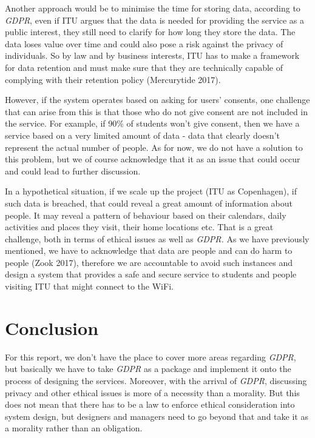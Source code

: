 \documentclass[format=acmsmall, review=false, screen=true]{acmart}
\begin{document}
Another approach would be to minimise the time for storing data, according to \textit{GDPR}, even if ITU argues that the data is needed for providing the service as a public interest, they still need to clarify for how long they store the data. The data loses value over time and could also pose a risk against the privacy of individuals. So by law and by business interests, ITU has to make a framework for data retention and must make sure that they are technically capable of complying with their retention policy (Mercurytide 2017).

However, if the system operates based on asking for users’ consents, one challenge that can arise from this is that those who do not give consent are not included in the service. For example, if 90\% of students won’t give consent, then we have a service based on a very limited amount of data - data that clearly doesn’t represent the actual number of people. As for now, we do not have a solution to this problem, but we of course acknowledge that it as an issue that could occur and could lead to further discussion.

In a hypothetical situation, if we scale up the project (ITU as Copenhagen), if such data is breached, that could reveal a great amount of information about people. It may reveal a pattern of behaviour based on their calendars, daily activities and places they visit, their home locations etc. That is a great challenge, both in terms of ethical issues as well as \textit{GDPR.}
As we have previously mentioned, we have to acknowledge that data are people and can do harm to people (Zook 2017), therefore we are accountable to avoid such instances and design a system that provides a safe and secure service to students and people visiting ITU that might connect to the WiFi. 

\section{Conclusion}
For this report, we don’t have the place to cover more areas regarding \textit{GDPR}, but basically we have to take \textit{GDPR} as a package and implement it onto the process of designing the services.
Moreover, with the arrival of \textit{GDPR}, discussing privacy and other ethical issues is more of a necessity than a morality. But this does not mean that there has to be a law to enforce ethical consideration into system design, but designers and managers need to go beyond that and take it as a morality rather than an obligation.
\end{document}
